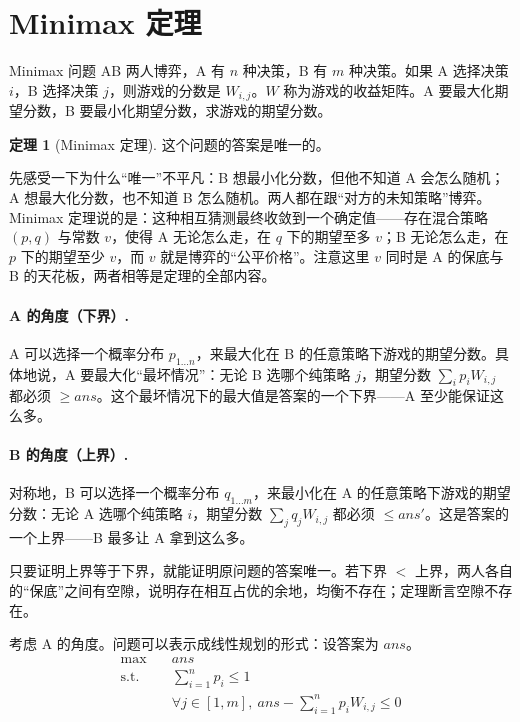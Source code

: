 \documentclass[UTF8,a4paper,11pt,oneside,openany,fontset=fandol]{ctexbook}
\theoremstyle{definition}
\newtheorem{theorem}[definition]{定理}
\begin{document}
\section{Minimax 定理}
\begin{problem}{Minimax 问题}
AB 两人博弈，A 有 $n$ 种决策，B 有 $m$ 种决策。如果 A 选择决策 $i$，B 选择决策 $j$，则游戏的分数是 $W_{i,j}$。$W$ 称为游戏的收益矩阵。A 要最大化期望分数，B 要最小化期望分数，求游戏的期望分数。
\end{problem}

\begin{theorem}[Minimax 定理]\label{thm:minimax}
这个问题的答案是唯一的。
\end{theorem}

先感受一下为什么“唯一”不平凡：B 想最小化分数，但他不知道 A 会怎么随机；A 想最大化分数，也不知道 B 怎么随机。两人都在跟“对方的未知策略”博弈。Minimax 定理说的是：这种相互猜测最终收敛到一个确定值——存在混合策略 $(p,q)$ 与常数 $v$，使得 A 无论怎么走，在 $q$ 下的期望至多 $v$；B 无论怎么走，在 $p$ 下的期望至少 $v$，而 $v$ 就是博弈的“公平价格”。注意这里 $v$ 同时是 A 的保底与 B 的天花板，两者相等是定理的全部内容。

\paragraph{A 的角度（下界）.} A 可以选择一个概率分布 $p_{1\ldots n}$，来最大化在 B 的任意策略下游戏的期望分数。具体地说，A 要最大化“最坏情况”：无论 B 选哪个纯策略 $j$，期望分数 $\sum_i p_iW_{i,j}$ 都必须 $\ge ans$。这个最坏情况下的最大值是答案的一个下界——A 至少能保证这么多。

\paragraph{B 的角度（上界）.} 对称地，B 可以选择一个概率分布 $q_{1\ldots m}$，来最小化在 A 的任意策略下游戏的期望分数：无论 A 选哪个纯策略 $i$，期望分数 $\sum_j q_jW_{i,j}$ 都必须 $\le ans'$。这是答案的一个上界——B 最多让 A 拿到这么多。

只要证明上界等于下界，就能证明原问题的答案唯一。若下界 $<$ 上界，两人各自的“保底”之间有空隙，说明存在相互占优的余地，均衡不存在；定理断言空隙不存在。

考虑 A 的角度。问题可以表示成线性规划的形式：设答案为 $ans$。
\[
 \begin{aligned}
 \max\quad & ans\\
 \text{s.t.}\quad & \sum_{i=1}^{n}p_i\le1\\
 & \forall j\in[1,m],\ ans-\sum_{i=1}^{n}p_iW_{i,j}\le0
 \end{aligned}
\]
\end{document}
